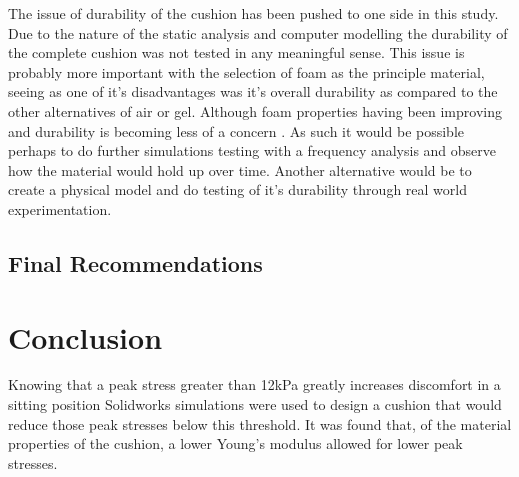 \documentclass[conference]{IEEEtran}
\begin{document}
    
    The issue of durability of the cushion has been pushed to one side in this study. Due to the nature of the static analysis and computer modelling the durability of the complete cushion was not tested in any meaningful sense. This issue is probably more important with the selection of foam as the principle material, seeing as one of it's disadvantages was it's overall durability as compared to the other alternatives of air or gel. Although foam properties having been improving and durability is becoming less of a concern \cite{Housel2004}. As such it would be possible perhaps to do further simulations testing with a frequency analysis and observe how the material would hold up over time. Another alternative would be to create a physical model and do testing of it's durability through real world experimentation. 
    
    \subsection{Final Recommendations}
    

\section{Conclusion}
Knowing that a peak stress greater than 12kPa greatly increases discomfort in a sitting position Solidworks simulations were used to design a cushion that would reduce those peak stresses below this threshold. It was found that, of the material properties of the cushion, a lower Young's modulus allowed for lower peak stresses. 






%
\end{document}
